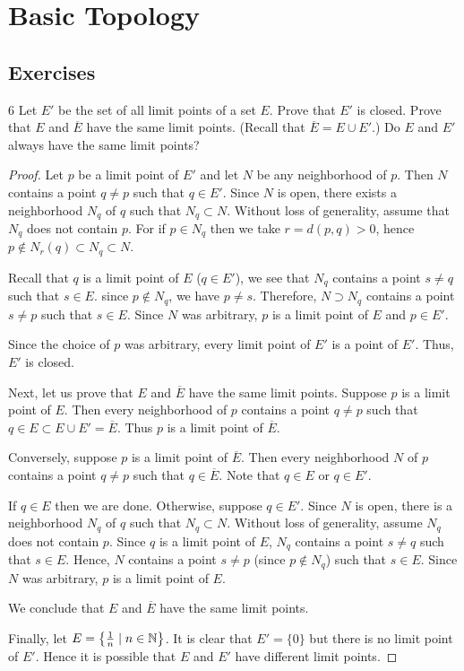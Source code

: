 \clearpage
\section{Basic Topology}
\subsection*{Exercises}

\begin{exercise}{6}
Let $E'$ be the set of all limit points of a set $E$. 
Prove that $E'$ is closed.
Prove that $E$ and $\overline{E}$ have the same limit points. (Recall that $\overline{E}=E \cup E'$.)
Do $E$ and $E'$ always have the same limit points?
\end{exercise}
\begin{proof}
Let $p$ be a limit point of $E'$ and let $N$ be any neighborhood of $p$.
Then $N$ contains a point $q \neq p$ such that $q \in E'$.
Since $N$ is open, there exists a neighborhood $N_q$ of $q$ such that $N_q \subset N$.
Without loss of generality, assume that $N_q$ does not contain $p$.
For if $p \in N_q$ then we take $r=d(p,q)>0$, hence $p \notin N_r(q) \subset N_q \subset N$.

Recall that $q$ is a limit point of $E$ ($q \in E'$), we see that $N_q$ contains a point $s \neq q$ such that $s \in E$.
since $p \notin N_q$, we have $p \neq s$.
Therefore, $N \supset N_q$ contains a point $s \neq p$ such that $s \in E$.
Since $N$ was arbitrary, $p$ is a limit point of $E$ and $p \in E'$.

Since the choice of $p$ was arbitrary, every limit point of $E'$ is a point of $E'$.
Thus, $E'$ is closed.

Next, let us prove that $E$ and $\overline{E}$ have the same limit points.
Suppose $p$ is a limit point of $E$.
Then every neighborhood of $p$ contains a point $q \neq p$ such that $q \in E \subset E \cup E' = \overline{E}$.
Thus $p$ is a limit point of $\overline{E}$. 

Conversely, suppose $p$ is a limit point of $\overline{E}$. 
Then every neighborhood $N$ of $p$ contains a point $q \neq p$ such that $q \in \overline{E}$.
Note that $q \in E$ or $q \in E'$. 

If $q \in E$ then we are done. 
Otherwise, suppose $q \in E'$. 
Since $N$ is open, there is a neighborhood $N_q$ of $q$ such that $N_q \subset N$.
Without loss of generality, assume $N_q$ does not contain $p$.
Since $q$ is a limit point of $E$, $N_q$ contains a point $s \neq q$ such that $s \in E$.
Hence, $N$ contains a point $s \neq p$ (since $p \notin N_q$) such that $s \in E$.
Since $N$ was arbitrary, $p$ is a limit point of $E$.

We conclude that $E$ and $\overline{E}$ have the same limit points.

Finally, let $E=\left\{\frac{1}{n} \mid n \in \mathbb{N}\right\}$. It is clear that $E' = \{0\}$ but there is no limit point of $E'$. Hence it is possible that $E$ and $E'$ have different limit points.
\end{proof}

